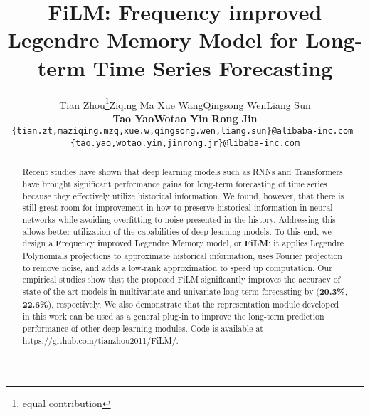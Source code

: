 \documentclass{article}
\title{FiLM: Frequency improved Legendre Memory Model for Long-term
Time Series Forecasting}
\author{Tian Zhou\thanks{equal contribution}\quad Ziqing Ma \quad  Xue Wang\quad Qingsong Wen\quad  Liang Sun \\ \textbf{Tao Yao}\quad \textbf{Wotao Yin} \quad  \textbf{Rong Jin} \\
\texttt{\{tian.zt,maziqing.mzq,xue.w,qingsong.wen,liang.sun\}@alibaba-inc.com }\\
\texttt{\{tao.yao,wotao.yin,jinrong.jr\}@libaba-inc.com}\\
}
\begin{document}
\maketitle


\begin{abstract}


Recent studies have shown that deep learning models such as RNNs and Transformers have brought significant performance gains for long-term forecasting of time series because they effectively utilize historical information. We found, however, that there is still great room for improvement in how to preserve historical information in neural networks while avoiding overfitting to noise presented in the history. Addressing this allows better utilization of the capabilities of deep learning models. To this end, we design a \textbf{F}requency \textbf{i}mproved \textbf{L}egendre \textbf{M}emory model, or {\bf FiLM}: it applies Legendre Polynomials projections to approximate historical information, uses Fourier projection to remove noise, and adds a low-rank approximation to speed up computation. Our empirical studies show that the proposed FiLM significantly improves the accuracy of state-of-the-art models in multivariate and univariate long-term forecasting by (\textbf{20.3\%}, \textbf{22.6\%}), respectively. We also demonstrate that the representation module developed in this work can be used as a general plug-in to improve the long-term prediction performance of other deep learning modules. Code is available at https://github.com/tianzhou2011/FiLM/.


  
\end{abstract}
\end{document}

